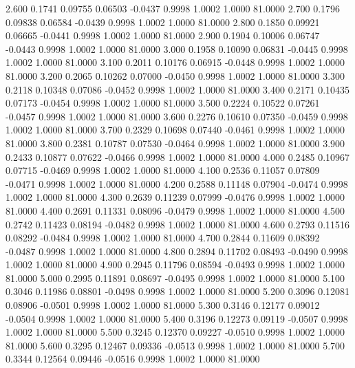    2.600   0.1741   0.09755   0.06503  -0.0437   0.9998   1.0002   1.0000  81.0000
   2.700   0.1796   0.09838   0.06584  -0.0439   0.9998   1.0002   1.0000  81.0000
   2.800   0.1850   0.09921   0.06665  -0.0441   0.9998   1.0002   1.0000  81.0000
   2.900   0.1904   0.10006   0.06747  -0.0443   0.9998   1.0002   1.0000  81.0000
   3.000   0.1958   0.10090   0.06831  -0.0445   0.9998   1.0002   1.0000  81.0000
   3.100   0.2011   0.10176   0.06915  -0.0448   0.9998   1.0002   1.0000  81.0000
   3.200   0.2065   0.10262   0.07000  -0.0450   0.9998   1.0002   1.0000  81.0000
   3.300   0.2118   0.10348   0.07086  -0.0452   0.9998   1.0002   1.0000  81.0000
   3.400   0.2171   0.10435   0.07173  -0.0454   0.9998   1.0002   1.0000  81.0000
   3.500   0.2224   0.10522   0.07261  -0.0457   0.9998   1.0002   1.0000  81.0000
   3.600   0.2276   0.10610   0.07350  -0.0459   0.9998   1.0002   1.0000  81.0000
   3.700   0.2329   0.10698   0.07440  -0.0461   0.9998   1.0002   1.0000  81.0000
   3.800   0.2381   0.10787   0.07530  -0.0464   0.9998   1.0002   1.0000  81.0000
   3.900   0.2433   0.10877   0.07622  -0.0466   0.9998   1.0002   1.0000  81.0000
   4.000   0.2485   0.10967   0.07715  -0.0469   0.9998   1.0002   1.0000  81.0000
   4.100   0.2536   0.11057   0.07809  -0.0471   0.9998   1.0002   1.0000  81.0000
   4.200   0.2588   0.11148   0.07904  -0.0474   0.9998   1.0002   1.0000  81.0000
   4.300   0.2639   0.11239   0.07999  -0.0476   0.9998   1.0002   1.0000  81.0000
   4.400   0.2691   0.11331   0.08096  -0.0479   0.9998   1.0002   1.0000  81.0000
   4.500   0.2742   0.11423   0.08194  -0.0482   0.9998   1.0002   1.0000  81.0000
   4.600   0.2793   0.11516   0.08292  -0.0484   0.9998   1.0002   1.0000  81.0000
   4.700   0.2844   0.11609   0.08392  -0.0487   0.9998   1.0002   1.0000  81.0000
   4.800   0.2894   0.11702   0.08493  -0.0490   0.9998   1.0002   1.0000  81.0000
   4.900   0.2945   0.11796   0.08594  -0.0493   0.9998   1.0002   1.0000  81.0000
   5.000   0.2995   0.11891   0.08697  -0.0495   0.9998   1.0002   1.0000  81.0000
   5.100   0.3046   0.11986   0.08801  -0.0498   0.9998   1.0002   1.0000  81.0000
   5.200   0.3096   0.12081   0.08906  -0.0501   0.9998   1.0002   1.0000  81.0000
   5.300   0.3146   0.12177   0.09012  -0.0504   0.9998   1.0002   1.0000  81.0000
   5.400   0.3196   0.12273   0.09119  -0.0507   0.9998   1.0002   1.0000  81.0000
   5.500   0.3245   0.12370   0.09227  -0.0510   0.9998   1.0002   1.0000  81.0000
   5.600   0.3295   0.12467   0.09336  -0.0513   0.9998   1.0002   1.0000  81.0000
   5.700   0.3344   0.12564   0.09446  -0.0516   0.9998   1.0002   1.0000  81.0000
